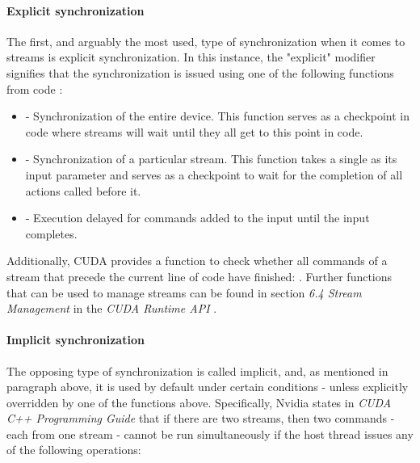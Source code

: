 \paragraph{Explicit synchronization}\label{Paragraph:theory-CUDA-asynchronous-concurrent-execution-streams-explicit-synchronization}
The first, and arguably the most used, type of synchronization when it comes to streams is explicit synchronization. In this instance, the "explicit" modifier signifies that the synchronization is issued using one of the following functions from code \cite{NVIDIAMay2022, NvidiaJanuary2022}:
\begin{itemize}
	\item {} - Synchronization of the entire device. This function serves as a checkpoint in code where streams will wait until they all get to this point in code.
	\item {} - Synchronization of a particular stream. This function takes a single  as its input parameter and serves as a checkpoint to wait for the completion of all actions called before it.
	\item {} - Execution delayed for commands added to the input  until the input  completes.
\end{itemize}

Additionally, CUDA provides a function to check whether all commands of a stream that precede the current line of code have finished: . Further functions that can be used to manage streams can be found in section \emph{6.4 Stream Management} in the \emph{CUDA Runtime API} \cite{NvidiaJanuary2022}.

\paragraph{Implicit synchronization}\label{Paragraph:theory-CUDA-asynchronous-concurrent-execution-streams-implicit-synchronization}
The opposing type of synchronization is called implicit, and, as mentioned in paragraph \textit{} above, it is used by default under certain conditions - unless explicitly overridden by one of the functions above. Specifically, Nvidia states in \emph{CUDA C++ Programming Guide} \cite{NVIDIAMay2022} that if there are two streams, then two commands - each from one stream - cannot be run simultaneously if the host thread issues any of the following operations:

